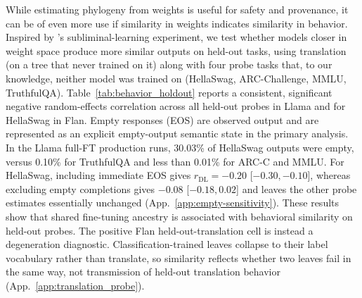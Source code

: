 \documentclass{article}
\theoremstyle{definition}
\theoremstyle{plain}
\begin{document}
While estimating phylogeny from weights is useful for safety and provenance, it can be of even more use if similarity in weights indicates similarity in behavior. Inspired by \citet{cloud2025subliminal}'s subliminal-learning experiment, we test
whether models closer in weight space produce more similar outputs on held-out tasks, using translation
(on a tree that never trained on it) along with four probe tasks that, to our knowledge, neither model
was trained on (HellaSwag, ARC-Challenge, MMLU, TruthfulQA).
Table~\ref{tab:behavior_holdout} reports a consistent, significant negative random-effects correlation across all held-out
probes in Llama and for HellaSwag in Flan. Empty responses (EOS) are observed output and are represented as an
explicit empty-output semantic state in the primary analysis. In the Llama full-FT production runs,
30.03\% of HellaSwag outputs were empty, versus 0.10\% for TruthfulQA and less than 0.01\% for ARC-C
and MMLU. For HellaSwag, including immediate EOS gives $r_{\mathrm{DL}}=-0.20$ [$-0.30,-0.10$], whereas excluding empty completions gives $-0.08$ [$-0.18,0.02$] and leaves the other probe estimates essentially unchanged (App.~\ref{app:empty-sensitivity}). These results show that shared fine-tuning ancestry is associated with behavioral similarity on held-out probes. The positive Flan held-out-translation cell is instead a degeneration diagnostic.
Classification-trained leaves collapse to their label vocabulary rather than translate, so similarity
reflects whether two leaves fail in the same way, not transmission of held-out translation behavior
(App.~\ref{app:translation_probe}).
\end{document}
